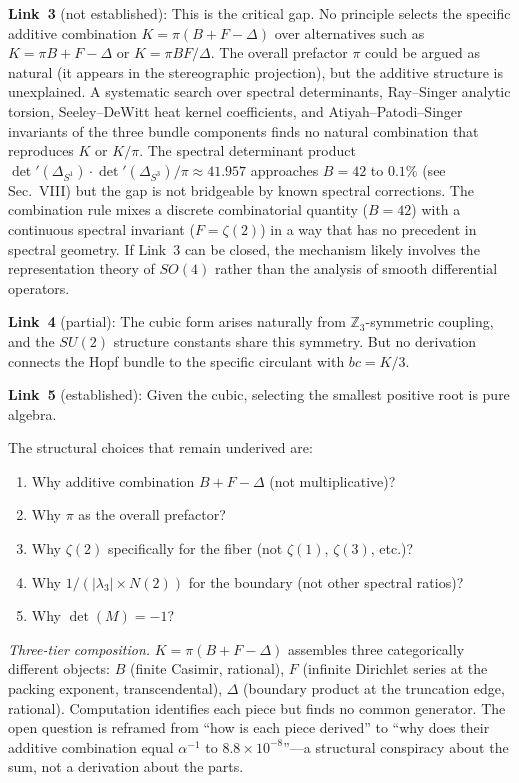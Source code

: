 \documentclass[aps,prl,twocolumn,superscriptaddress]{revtex4-2}
\begin{document}
\textbf{Link~3} (not established): This is the critical gap. No
principle selects the specific additive combination
$K = \pi(B + F - \Delta)$ over alternatives such as
$K = \pi B + F - \Delta$ or $K = \pi B F / \Delta$. The overall
prefactor $\pi$ could be argued as natural (it appears in the
stereographic projection), but the additive structure is unexplained.
A systematic search over spectral determinants, Ray--Singer analytic
torsion, Seeley--DeWitt heat kernel coefficients, and
Atiyah--Patodi--Singer invariants of the three bundle components finds
no natural combination that reproduces $K$ or $K/\pi$. The spectral
determinant product
$\det'(\Delta_{S^1}) \cdot \det'(\Delta_{S^3})/\pi \approx 41.957$
approaches $B = 42$ to $0.1\%$ (see Sec.~VIII) but the gap is not
bridgeable by known spectral corrections. The combination rule mixes a
discrete combinatorial quantity ($B = 42$) with a continuous spectral
invariant ($F = \zeta(2)$) in a way that has no precedent in spectral
geometry. If Link~3 can be closed, the mechanism likely involves the
representation theory of $SO(4)$ rather than the analysis of smooth
differential operators.

\textbf{Link~4} (partial): The cubic form arises naturally from
$\mathbb{Z}_3$-symmetric coupling, and the $SU(2)$ structure constants
share this symmetry. But no derivation connects the Hopf bundle to the
specific circulant with $bc = K/3$.

\textbf{Link~5} (established): Given the cubic, selecting the smallest
positive root is pure algebra.

The structural choices that remain underived are:
\begin{enumerate}
\item Why additive combination $B + F - \Delta$ (not multiplicative)?
\item Why $\pi$ as the overall prefactor?
\item Why $\zeta(2)$ specifically for the fiber (not $\zeta(1)$,
  $\zeta(3)$, etc.)?
\item Why $1/(|\lambda_3| \times N(2))$ for the boundary (not other
  spectral ratios)?
\item Why $\det(M) = -1$?
\end{enumerate}

\textit{Three-tier composition.} $K = \pi(B + F - \Delta)$ assembles
three categorically different objects: $B$ (finite Casimir, rational),
$F$ (infinite Dirichlet series at the packing exponent,
transcendental), $\Delta$ (boundary product at the truncation edge,
rational). Computation identifies each piece but finds no common
generator. The open question is reframed from ``how is each piece
derived'' to ``why does their additive combination equal
$\alpha^{-1}$ to $8.8\times 10^{-8}$''---a structural conspiracy
about the sum, not a derivation about the parts.
\end{document}
